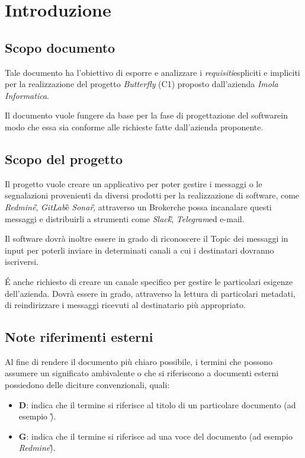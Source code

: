 \section{Introduzione}

	\subsection{Scopo documento}
	Tale documento ha l'obiettivo di esporre e analizzare i \textit{requisiti}\GAlt espliciti e impliciti per la realizzazione del progetto \textit{Butterfly} (C1) proposto dall'azienda \textit{Imola Informatica}.
	
	Il documento vuole fungere da base per la fase di progettazione del software\GAlt in modo che essa sia conforme alle richieste fatte dall'azienda proponente.
	
	\subsection{Scopo del progetto}
	Il progetto vuole creare un applicativo per poter gestire i messaggi o le segnalazioni provenienti da diversi prodotti per la realizzazione di software, come \textit{Redmine}\G, \textit{GitLab}\G e \textit{Sonar}\G, attraverso un Broker\GAlt che possa incanalare questi messaggi e distribuirli a strumenti come \textit{Slack}\G, \textit{Telegram}\GAlt ed e-mail.
	
	Il software dovrà inoltre essere in grado di riconoscere il Topic dei messaggi in input per poterli inviare in determinati canali a cui i destinatari dovranno iscriversi.
	
	\'E anche richiesto di creare un canale specifico per gestire le particolari esigenze dell'azienda. Dovrà essere in grado, attraverso la lettura di particolari metadati\GAlt, di reindirizzare i messaggi ricevuti al destinatario più appropriato.
	
	\subsection{Note riferimenti esterni}
	Al fine di rendere il documento più chiaro possibile, i termini che possono assumere un significato ambivalente o che si riferiscono a documenti esterni possiedono delle diciture convenzionali, quali:
	
	\begin{itemize}
		\item \textbf{D}: indica che il termine si riferisce al titolo di un particolare documento (ad esempio \textit{\PdPv}\G).
		\item \textbf{G}: indica che il termine si riferisce ad una voce del documento \textit{\Gl} (ad esempio \textit{Redmine}\G).
	\end{itemize}

